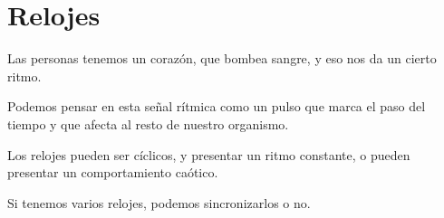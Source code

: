 \documentclass[../principal.tex]{subfiles}
\begin{document}

\chapter{Relojes}

Las personas tenemos un corazón, que bombea sangre, y eso nos da un cierto ritmo.

Podemos pensar en esta señal rítmica como un pulso que marca el paso del tiempo y que afecta al resto de nuestro organismo.

Los relojes pueden ser cíclicos, y presentar un ritmo constante, o pueden presentar un comportamiento caótico.

Si tenemos varios relojes, podemos sincronizarlos o no.

\newpage
\end{document}
